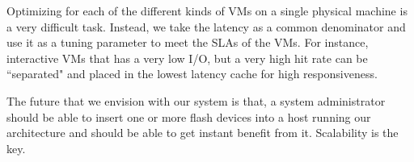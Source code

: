 Optimizing for each of the different kinds of VMs on a single physical machine is a very difficult task. Instead, we take the latency as a common denominator and use it as a tuning parameter to meet the SLAs of the VMs. For instance, interactive VMs that has a very low I/O, but a very high hit rate can be ``separated" and placed in the lowest latency cache for high responsiveness.

The future that we envision with our system is that, a system administrator should be able to insert one or more flash devices into a host running our architecture and should be able to get instant benefit from it. Scalability is the key.
